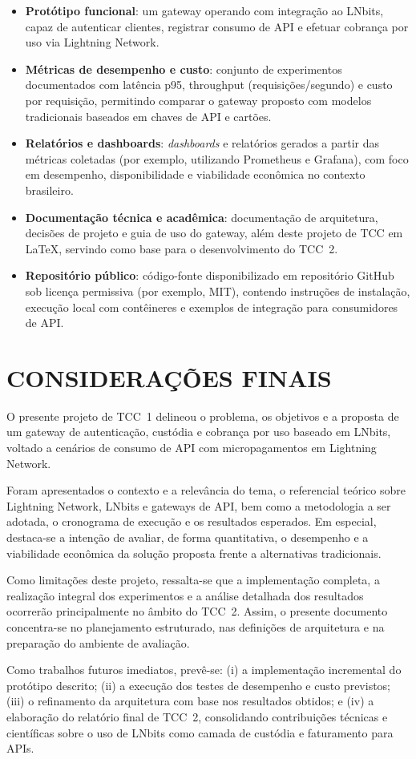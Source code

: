 \documentclass[openright]{normas-utf-tex}
\begin{document}
\begin{itemize}
    \item \textbf{Protótipo funcional}: um gateway operando com integração ao LNbits, capaz de autenticar clientes, registrar consumo de API e efetuar cobrança por uso via Lightning Network.
    \item \textbf{Métricas de desempenho e custo}: conjunto de experimentos documentados com latência p95, throughput (requisições/segundo) e custo por requisição, permitindo comparar o gateway proposto com modelos tradicionais baseados em chaves de API e cartões.
    \item \textbf{Relatórios e dashboards}: \textit{dashboards} e relatórios gerados a partir das métricas coletadas (por exemplo, utilizando Prometheus e Grafana), com foco em desempenho, disponibilidade e viabilidade econômica no contexto brasileiro.
    \item \textbf{Documentação técnica e acadêmica}: documentação de arquitetura, decisões de projeto e guia de uso do gateway, além deste projeto de TCC em LaTeX, servindo como base para o desenvolvimento do TCC~2.
    \item \textbf{Repositório público}: código-fonte disponibilizado em repositório GitHub sob licença permissiva (por exemplo, MIT), contendo instruções de instalação, execução local com contêineres e exemplos de integração para consumidores de API.
\end{itemize}

\chapter{CONSIDERAÇÕES FINAIS}

O presente projeto de TCC~1 delineou o problema, os objetivos e a proposta de um gateway de autenticação, custódia e cobrança por uso baseado em LNbits, voltado a cenários de consumo de API com micropagamentos em Lightning Network.

Foram apresentados o contexto e a relevância do tema, o referencial teórico sobre Lightning Network, LNbits e gateways de API, bem como a metodologia a ser adotada, o cronograma de execução e os resultados esperados. Em especial, destaca-se a intenção de avaliar, de forma quantitativa, o desempenho e a viabilidade econômica da solução proposta frente a alternativas tradicionais.

Como limitações deste projeto, ressalta-se que a implementação completa, a realização integral dos experimentos e a análise detalhada dos resultados ocorrerão principalmente no âmbito do TCC~2. Assim, o presente documento concentra-se no planejamento estruturado, nas definições de arquitetura e na preparação do ambiente de avaliação.

Como trabalhos futuros imediatos, prevê-se: (i) a implementação incremental do protótipo descrito; (ii) a execução dos testes de desempenho e custo previstos; (iii) o refinamento da arquitetura com base nos resultados obtidos; e (iv) a elaboração do relatório final de TCC~2, consolidando contribuições técnicas e científicas sobre o uso de LNbits como camada de custódia e faturamento para APIs.


\end{document}
